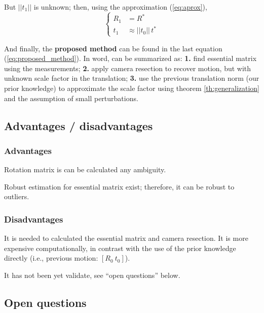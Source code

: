 \noindent
But $||t_1||$ is unknown; then, using the approximation (\ref{eq:aprox}),
\begin{equation}
\label{eq:proposed_method}
\left\{
  \begin{align}
  R_1 & = R^* \\
  t_1 & \approx ||t_0||\,t^*
  \end{align}
\right.
\end{equation}

\noindent
And finally, the \textbf{proposed method} can be found in the last equation (\ref{eq:proposed_method}). In word, can be summarized as: \textbf{1.} find essential matrix using the measurements; \textbf{2.} apply camera resection to recover motion, but with unknown scale factor in the translation; \textbf{3.} use the previous translation norm (our prior knowledge) to approximate the scale factor using theorem \ref{th:generalization} and the assumption of small perturbations.

\subsection{Advantages / disadvantages}
\subsubsection{Advantages}
\begin{itemize*}
 \item Rotation matrix is can be calculated any ambiguity.
 \item Robust estimation for essential matrix exist; therefore, it can be robust to outliers.
\end{itemize*}

\subsubsection{Disadvantages}
\begin{itemize*}
 \item It is needed to calculated the essential matrix and camera resection. It is more expensive computationally, in contrast with the use of the prior knowledge directly (i.e., previous motion: $[R_0~t_0]$).

 \item It has not been yet validate, see ``open questions'' below.
\end{itemize*}



\subsection{Open questions}

